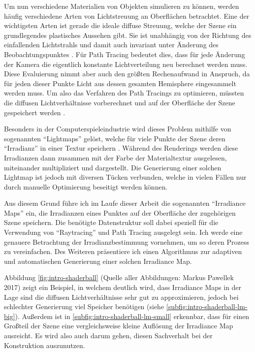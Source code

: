 	Um nun verschiedene Materialien von Objekten simulieren zu können, werden häufig verschiedene Arten von Lichtstreuung an Oberflächen betrachtet.
	Eine der wichtigsten Arten ist gerade die ideale diffuse Streuung, welche der Szene ein grundlegendes plastisches Aussehen gibt.
	Sie ist unabhängig von der Richtung des einfallenden Lichtstrahls und damit auch invariant unter Änderung des Beobachtungspunktes \cite{intro-radiometry}.
	Für Path Tracing bedeutet dies, dass für jede Änderung der Kamera die eigentlich konstante Lichtverteilung neu berechnet werden muss.
	Diese Evaluierung nimmt aber auch den größten Rechenaufwand in Anspruch, da für jeden dieser Punkte Licht aus dessen gesamten Hemisphere eingesammelt werden muss.
	Um also das Verfahren des Path Tracings zu optimieren, müssten die diffusen Lichtverhältnisse vorberechnet und auf der Oberfläche der Szene gespeichert werden \cite{irradiance-caching}.

	Besonders in der Computerspieleindustrie wird dieses Problem mithilfe von sogenannten \enquote{Lightmaps} gelöst, welche für viele Punkte der Szene deren \enquote{Irradianz} in einer Textur speichern \cite{tricks-game}.
	Während des Renderings werden diese Irradianzen dann zusammen mit der Farbe der Materialtextur ausgelesen, miteinander multipliziert und dargestellt.
	Die Generierung einer solchen Lightmap ist jedoch mit diversen Tücken verbunden, welche in vielen Fällen nur durch manuelle Optimierung beseitigt werden können.

	Aus diesem Grund führe ich im Laufe dieser Arbeit die sogenannten \enquote{Irradiance Maps} ein, die Irradianzen eines Punktes auf der Oberfläche der zugehörigen Szene speichern.
	Die benötigte Datenstruktur soll dabei speziell für die Verwendung von \enquote{Raytracing} und Path Tracing ausgelegt sein.
	Ich werde eine genauere Betrachtung der Irradianzbestimmung vornehmen, um so deren Prozess zu vereinfachen.
	Des Weiteren präsentiere ich einen Algorithmus zur adaptiven und automatischen Generierung einer solchen Irradiance Map.

	Abbildung \ref{fig:intro-shaderball} (Quelle aller Abbildungen: Markus Pawellek 2017) zeigt ein Beispiel, in welchem deutlich wird, dass Irradiance Maps in der Lage sind die diffusen Lichtverhältnisse sehr gut zu approximieren, jedoch bei schlechter Generierung viel Speicher benötigen (siehe \ref{subfig:intro-shaderball-lm-big}).
	Außerdem ist in \ref{subfig:intro-shaderball-lm-small} erkennbar, dass für einen Großteil der Szene eine vergleichsweise kleine Auflösung der Irradiance Map ausreicht.
	Es wird also auch darum gehen, diesen Sachverhalt bei der Konstruktion auszunutzen.

